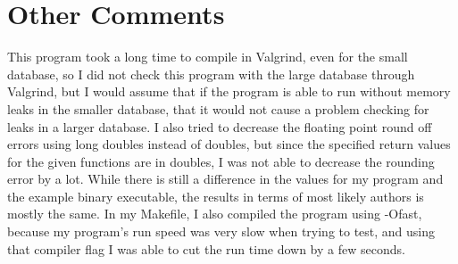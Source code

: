 \documentclass[11pt]{article}
\begin{document}
\section{Other Comments}\label{ss:comments}
This program took a long time to compile in Valgrind, even for the small database, so I did not check this program with the large database through Valgrind, but I would assume that if the program is able to run without memory leaks in the smaller database, that it would not cause a problem checking for leaks in a larger database. I also tried to decrease the floating point round off errors using long doubles instead of doubles, but since the specified return values for the given functions are in doubles, I was not able to decrease the rounding error by a lot. While there is still a difference in the values for my program and the example binary executable, the results in terms of most likely authors is mostly the same. In my Makefile, I also compiled the program using -Ofast, because my program's run speed was very slow when trying to test, and using that compiler flag I was able to cut the run time down by a few seconds.
\end{document}
